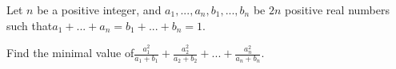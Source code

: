 Let $n$ be a positive integer, and $a_1,...,a_n, b_1,..., b_n$ be $2n$ positive real numbers such that$a_1 + ... + a_n = b_1 + ... + b_n = 1$.

Find the minimal value of$ \frac {a_1^2} {a_1 + b_1} + \frac {a_2^2} {a_2 + b_2} + ...+ \frac {a_n^2} {a_n + b_n}$.